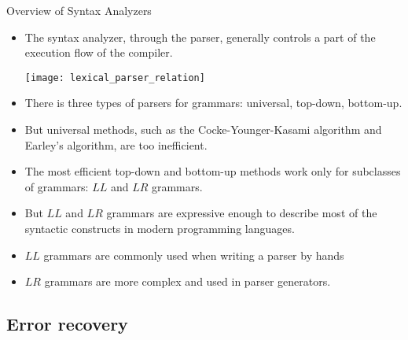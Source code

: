 \begin{bibunit}[apalike]
\begin{frame}[allowframebreaks]{Overview of Syntax Analyzers}
	\begin{itemize}
	\item The syntax analyzer, through the parser, generally controls a part of the execution flow of the compiler.
	\vfill
		\begin{center}
			\texttt{[image: lexical\_parser\_relation]}
		\end{center}
	\vfill
	\item There is three types of parsers for grammars: universal, top-down, bottom-up.
	\item But universal methods, such as the Cocke-Younger-Kasami algorithm and Earley's algorithm, are too inefficient.
	\item The most efficient top-down and bottom-up methods work only for subclasses of grammars: $LL$ and $LR$ grammars.
	\item But $LL$ and $LR$ grammars are expressive enough to describe most of the syntactic constructs in modern programming languages.
	\item $LL$ grammars are commonly used when writing a parser by hands
	\item $LR$ grammars are more complex and used in parser generators.
	\end{itemize}
\end{frame}

\subsection{Error recovery}


\end{bibunit}
